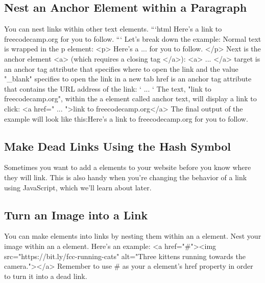 \documentclass{article}%
\begin{document}
\subsection{Nest an Anchor Element within a Paragraph}%
\label{subsec:NestanAnchorElementwithinaParagraph}%
You can nest links within other text elements.\newline%
```html\newline%
  Here's a  link to freecodecamp.org for you to follow.\newline%
```\newline%
Let's break down the example:\newline%
Normal text is wrapped in the p element: <p> Here's a ... for you to follow. </p>\newline%
Next is the anchor element <a> (which requires a closing tag </a>): <a> ... </a>\newline%
target is an anchor tag attribute that specifies where to open the link and the value "\_blank" specifies to open the link in a new tab\newline%
href is an anchor tag attribute that contains the URL address of the link:  ` ... `\newline%
The text, "link to freecodecamp.org", within the a element called anchor text, will display a link to click: <a href=" ... ">link to freecodecamp.org</a>\newline%
The final output of the example will look like this:Here's a  link to freecodecamp.org for you to follow.\newline%

%
\subsection{Make Dead Links Using the Hash Symbol}%
\label{subsec:MakeDeadLinksUsingtheHashSymbol}%
Sometimes you want to add a elements to your website before you know where they will link.\newline%
This is also handy when you're changing the behavior of a link using JavaScript, which we'll learn about later.\newline%

%
\subsection{Turn an Image into a Link}%
\label{subsec:TurnanImageintoaLink}%
You can make elements into links by nesting them within an a element.\newline%
Nest your image within an a element. Here's an example:\newline%
<a href="\#"><img src="https://bit.ly/fcc{-}running{-}cats" alt="Three kittens running towards the camera."></a>\newline%
Remember to use \# as your a element's href property in order to turn it into a dead link.\newline%
\end{document}
